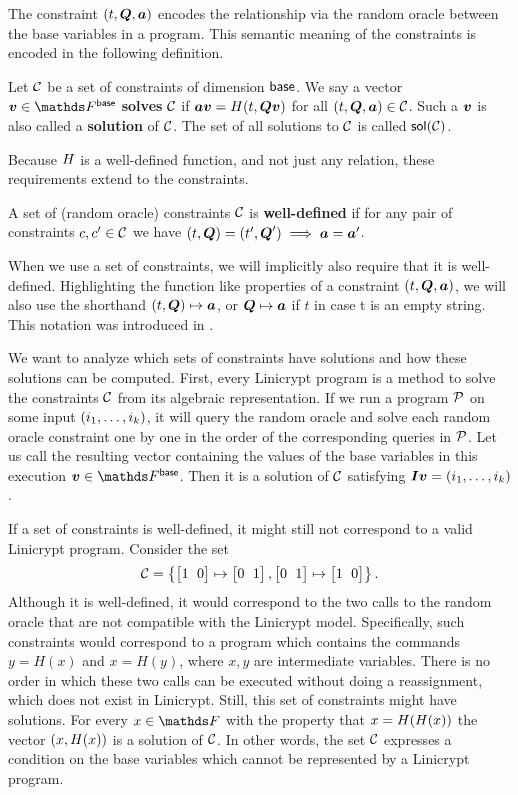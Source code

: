 The constraint $(t, \Q, \va)$ encodes the relationship via the random oracle between the base variables in a program.
This semantic meaning of the constraints is encoded in the following definition.
\begin{defn}
    Let $\C$ be a set of constraints of dimension $\base$.
    We say a vector $\vv \in \Base$ \textbf{solves} $\C$ if
    $\va \vv = \H(t, \Q \vv)$ for all $(t, \Q, \va) \in \C$.
    Such a $\vv$ is also called a \textbf{solution} of $\C$.
    The set of all solutions to $\C$ is called $\sol(\C)$.
\end{defn}

Because $\H$ is a well-defined function,
and not just any relation,
these requirements extend to the constraints.

\begin{defn}
A set of (random oracle) constraints $\C$ is \textbf{well-defined} if for any pair of constraints 
$c, c' \in \C$ we have $(t,\Q) = (t', \Q') \implies \va = \va'$.
\end{defn}

When we use a set of constraints, we will implicitly also require that it is well-defined.
Highlighting the function like properties of a constraint $(t, \Q, \va)$,
we will also use the shorthand $(t,\Q) \mapsto \va$, or $\Q \mapsto \va$ if $t$ in case t is an empty string.
This notation was introduced in \cite{EPRINT:HolRosRoy22}.

We want to analyze which sets of constraints have solutions and how these solutions can be computed.
First, every Linicrypt program is a method to solve the constraints $\C$ from its algebraic representation.
If we run a program $\P$ on some input $(\dts i k)$,
it will query the random oracle
and solve each random oracle constraint one by one in the order of the corresponding queries in $\P$.
Let us call the resulting vector containing the values of the base variables in this execution $\vv \in \Fsp$.
Then it is a solution of $\C$ satisfying $\I\vv = (\dts i k)$.

If a set of constraints is well-defined, it might still not  correspond to a valid Linicrypt program.
Consider the set
\[
\C = \left\{ \m{1&0} \mapsto \m{0&1}, \m{0&1} \mapsto \m{1&0}\right\}.
\]
Although it is well-defined,
it would correspond to the two calls to the random oracle that are not compatible with the Linicrypt model.
Specifically, such constraints would correspond to a program which contains the commands
$y = H(x)$ and $x = H(y)$, where $x,y$ are intermediate variables.
There is no order in which these two calls can be executed without doing a reassignment,
which does not exist in Linicrypt.
Still, this set of constraints might have solutions.
For every $x \in \F$ with the property that $x = \H(\H(x))$ the vector $(x, \H(x))$ is a solution of $\C$.
In other words,
the set $\C$ expresses a condition on the base variables which cannot be represented by a Linicrypt program.

